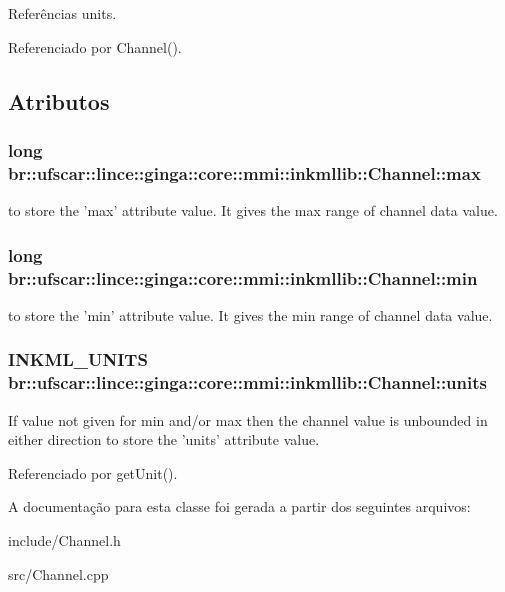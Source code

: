 Referências units.



Referenciado por Channel().



\subsection{Atributos}
\subsubsection[{max}]{\setlength{\rightskip}{0pt plus 5cm}long {\bf br::ufscar::lince::ginga::core::mmi::inkmllib::Channel::max}}\label{classbr_1_1ufscar_1_1lince_1_1ginga_1_1core_1_1mmi_1_1inkmllib_1_1Channel_a52f9bda1d956ebff8c5228b1ae88e2a3}
to store the 'max' attribute value. It gives the max range of channel data value. 
\subsubsection[{min}]{\setlength{\rightskip}{0pt plus 5cm}long {\bf br::ufscar::lince::ginga::core::mmi::inkmllib::Channel::min}}\label{classbr_1_1ufscar_1_1lince_1_1ginga_1_1core_1_1mmi_1_1inkmllib_1_1Channel_a8d163f255bed6fc5edb97a66da6a5c89}
to store the 'min' attribute value. It gives the min range of channel data value. 
\subsubsection[{units}]{\setlength{\rightskip}{0pt plus 5cm}INKML\_\-UNITS {\bf br::ufscar::lince::ginga::core::mmi::inkmllib::Channel::units}}\label{classbr_1_1ufscar_1_1lince_1_1ginga_1_1core_1_1mmi_1_1inkmllib_1_1Channel_abb63621653a13bab4cdfe575af4ce578}
If value not given for min and/or max then the channel value is unbounded in either direction to store the 'units' attribute value. 

Referenciado por getUnit().



A documentação para esta classe foi gerada a partir dos seguintes arquivos:\begin{DoxyCompactItemize}
\item 
include/Channel.h\item 
src/Channel.cpp\end{DoxyCompactItemize}

